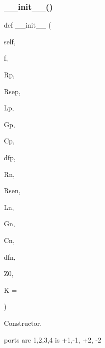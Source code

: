 \subsubsection{\texorpdfstring{\+\_\+\+\_\+init\+\_\+\+\_\+()}{\_\_init\_\_()}}
{\footnotesize\ttfamily def \+\_\+\+\_\+init\+\_\+\+\_\+ (\begin{DoxyParamCaption}\item[{}]{self,  }\item[{}]{f,  }\item[{}]{Rp,  }\item[{}]{Rsep,  }\item[{}]{Lp,  }\item[{}]{Gp,  }\item[{}]{Cp,  }\item[{}]{dfp,  }\item[{}]{Rn,  }\item[{}]{Rsen,  }\item[{}]{Ln,  }\item[{}]{Gn,  }\item[{}]{Cn,  }\item[{}]{dfn,  }\item[{}]{Z0,  }\item[{}]{K = {} }\end{DoxyParamCaption})}



Constructor. 

ports are 1,2,3,4 is +1,-\/1, +2, -\/2


